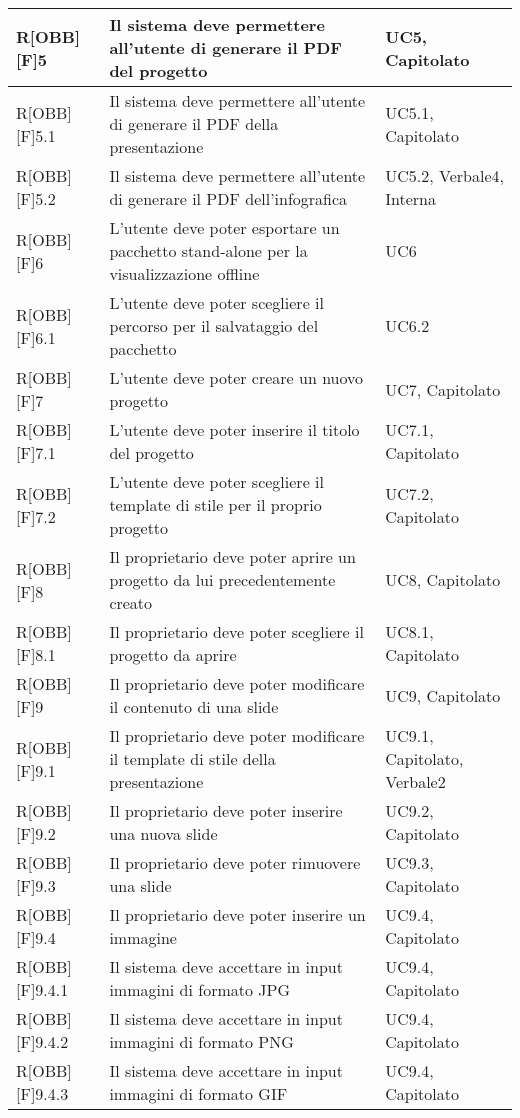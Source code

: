 \begin{table}[h]
\begin{tabular}{|p{}|p{}|p{}|}
		\end{tabular}
	\end{table}
	\newpage
	
	\begin{table}[h]
		\begin{tabular}{|p{}|p{}|p{}|}
			\midrule

R[OBB][F]5 & Il sistema deve permettere all'utente di generare il PDF del progetto & UC5, Capitolato \\ \midrule
R[OBB][F]5.1 & Il sistema deve permettere all'utente di generare il PDF della presentazione & UC5.1, Capitolato \\ \midrule
R[OBB][F]5.2 & Il sistema deve permettere all'utente di generare il PDF dell'\gls{infografica} & UC5.2, Verbale4, Interna \\ \midrule
R[OBB][F]6 & L'utente deve poter esportare un pacchetto stand-alone per la visualizzazione offline & UC6 \\ \midrule
R[OBB][F]6.1 & L'utente deve poter scegliere il percorso per il salvataggio del pacchetto & UC6.2 \\ \midrule
R[OBB][F]7 & L'utente deve poter creare un nuovo progetto & UC7, Capitolato \\ \midrule
R[OBB][F]7.1 & L'utente deve poter inserire il titolo del progetto & UC7.1, Capitolato \\ \midrule
R[OBB][F]7.2 & L'utente deve poter scegliere il \gls{template} di stile per il proprio progetto & UC7.2, Capitolato \\ \midrule
R[OBB][F]8 & Il proprietario deve poter aprire un progetto da lui precedentemente creato & UC8, Capitolato \\ \midrule
R[OBB][F]8.1 & Il proprietario deve poter scegliere il progetto da aprire & UC8.1, Capitolato \\ \midrule
R[OBB][F]9 & Il proprietario deve poter modificare il contenuto di una \gls{slide} & UC9, Capitolato \\ \midrule
R[OBB][F]9.1 & Il proprietario deve poter modificare il \gls{template} di stile della presentazione & UC9.1, Capitolato, Verbale2 \\ \midrule
R[OBB][F]9.2 & Il proprietario deve poter inserire una nuova \gls{slide} & UC9.2, Capitolato \\ \midrule
R[OBB][F]9.3 & Il proprietario deve poter rimuovere una \gls{slide} & UC9.3, Capitolato \\ \midrule
R[OBB][F]9.4 & Il proprietario deve poter inserire un immagine & UC9.4, Capitolato \\ \midrule
R[OBB][F]9.4.1 & Il sistema deve accettare in input immagini di formato JPG & UC9.4, Capitolato \\ \midrule
R[OBB][F]9.4.2 & Il sistema deve accettare in input immagini di formato \gls{PNG} & UC9.4, Capitolato \\ \midrule
R[OBB][F]9.4.3 & Il sistema deve accettare in input immagini di formato GIF & UC9.4, Capitolato \\ \midrule

		\end{tabular}
	\end{table}

